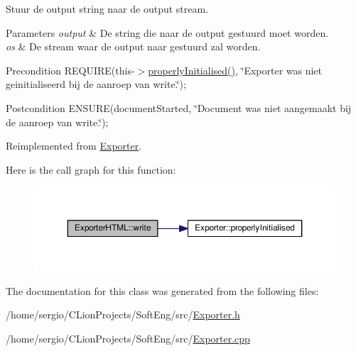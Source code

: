 Stuur de output string naar de output stream. 


\begin{DoxyParams}{Parameters}
{\em output} & De string die naar de output gestuurd moet worden. \\
\hline
{\em os} & De stream waar de output naar gestuurd zal worden. \\
\hline
\end{DoxyParams}
\begin{DoxyPrecond}{Precondition}
R\+E\+Q\+U\+I\+RE(this-\/$>$\hyperlink{class_exporter_aafd9df9210aeefd7bb7fd434fc317cf0}{properly\+Initialised()}, \char`\"{}\+Exporter was niet geinitialiseerd bij de aanroep van write.\char`\"{}); 
\end{DoxyPrecond}
\begin{DoxyPostcond}{Postcondition}
E\+N\+S\+U\+RE(document\+Started, \char`\"{}\+Document was niet aangemaakt bij de aanroep van write.\char`\"{}); 
\end{DoxyPostcond}


Reimplemented from \hyperlink{class_exporter_ab3736803133eb727cf87a7306f91eb11}{Exporter}.

Here is the call graph for this function\+:\nopagebreak
\begin{figure}[H]
\begin{center}
\leavevmode
\includegraphics[width=350pt]{class_exporter_h_t_m_l_ace2649c240282289d4cb3bfbd19e427c_cgraph}
\end{center}
\end{figure}


The documentation for this class was generated from the following files\+:\begin{DoxyCompactItemize}
\item 
/home/sergio/\+C\+Lion\+Projects/\+Soft\+Eng/src/\hyperlink{_exporter_8h}{Exporter.\+h}\item 
/home/sergio/\+C\+Lion\+Projects/\+Soft\+Eng/src/\hyperlink{_exporter_8cpp}{Exporter.\+cpp}\end{DoxyCompactItemize}
